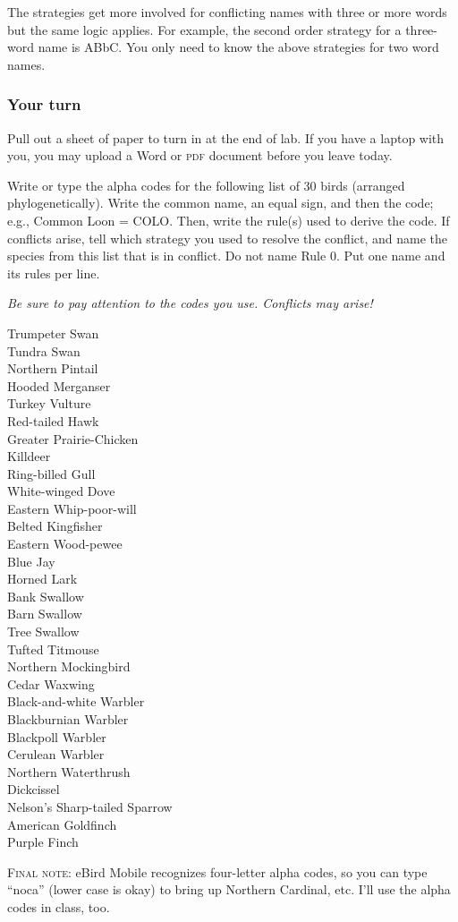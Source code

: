 \documentclass[11pt]{article}
\begin{document}
The strategies get more involved for conflicting names with three or more words but the same logic applies. For example, the second order strategy for a three-word name is ABbC. You only need to know the above strategies for two word names.

\newpage

\subsubsection*{Your turn}

Pull out a sheet of paper to turn in at the end of lab. If you have a laptop with you, you may upload a Word or \textsc{pdf} document before you leave  today. 

Write or type the alpha codes for the following list of 30 birds (arranged phylogenetically). Write the common name, an equal sign, and then the code; e.g., Common Loon = COLO.  Then, write the rule(s) used to derive the code. If conflicts arise, tell which  strategy you used to resolve the conflict, and name the species from this list that is in conflict. Do not name Rule 0. Put one name and its rules per line. 

\emph{Be sure to pay attention to the codes you use. Conflicts may arise!}

\begin{multicols}{2}
Trumpeter Swan\\
Tundra Swan\\
Northern Pintail\\
Hooded Merganser\\
Turkey Vulture\\
Red-tailed Hawk\\
Greater Prairie-Chicken\\
Killdeer\\
Ring-billed Gull\\
White-winged Dove\\
Eastern Whip-poor-will\\
Belted Kingfisher\\
Eastern Wood-pewee\\
Blue Jay\\
Horned Lark\\
Bank Swallow\\
Barn Swallow\\
Tree Swallow\\
Tufted Titmouse\\
Northern Mockingbird\\
Cedar Waxwing\\
Black-and-white Warbler\\
Blackburnian Warbler\\
Blackpoll Warbler\\
Cerulean Warbler\\
Northern Waterthrush\\
Dickcissel\\
Nelson's Sharp-tailed Sparrow\\
American Goldfinch\\
Purple Finch
\end{multicols}

\textsc{Final note:} eBird Mobile recognizes four-letter alpha codes, so you can type “noca” (lower case is okay) to bring up Northern Cardinal, etc. I'll use the alpha codes in class, too. 
\end{document}

